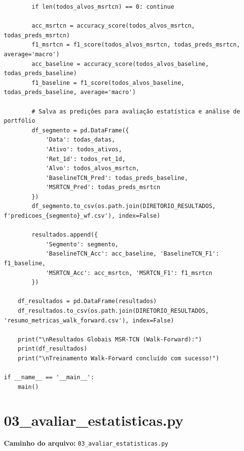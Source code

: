 \documentclass{article}
\begin{document}
\begin{verbatim}
        if len(todos_alvos_msrtcn) == 0: continue
            
        acc_msrtcn = accuracy_score(todos_alvos_msrtcn, todas_preds_msrtcn)
        f1_msrtcn = f1_score(todos_alvos_msrtcn, todas_preds_msrtcn, average='macro')
        acc_baseline = accuracy_score(todos_alvos_baseline, todas_preds_baseline)
        f1_baseline = f1_score(todos_alvos_baseline, todas_preds_baseline, average='macro')
        
        # Salva as predições para avaliação estatística e análise de portfólio
        df_segmento = pd.DataFrame({
            'Data': todas_datas,
            'Ativo': todos_ativos,
            'Ret_1d': todos_ret_1d,
            'Alvo': todos_alvos_msrtcn,
            'BaselineTCN_Pred': todas_preds_baseline,
            'MSRTCN_Pred': todas_preds_msrtcn
        })
        df_segmento.to_csv(os.path.join(DIRETORIO_RESULTADOS, f'predicoes_{segmento}_wf.csv'), index=False)
        
        resultados.append({
            'Segmento': segmento,
            'BaselineTCN_Acc': acc_baseline, 'BaselineTCN_F1': f1_baseline,
            'MSRTCN_Acc': acc_msrtcn, 'MSRTCN_F1': f1_msrtcn
        })
        
    df_resultados = pd.DataFrame(resultados)
    df_resultados.to_csv(os.path.join(DIRETORIO_RESULTADOS, 'resumo_metricas_walk_forward.csv'), index=False)
    
    print("\nResultados Globais MSR-TCN (Walk-Forward):")
    print(df_resultados)
    print("\nTreinamento Walk-Forward concluído com sucesso!")

if __name__ == '__main__':
    main()
\end{verbatim}

\newpage

\section{03\_avaliar\_estatisticas.py}
\textbf{Caminho do arquivo:} \texttt{03\_avaliar\_estatisticas.py}
\end{document}
